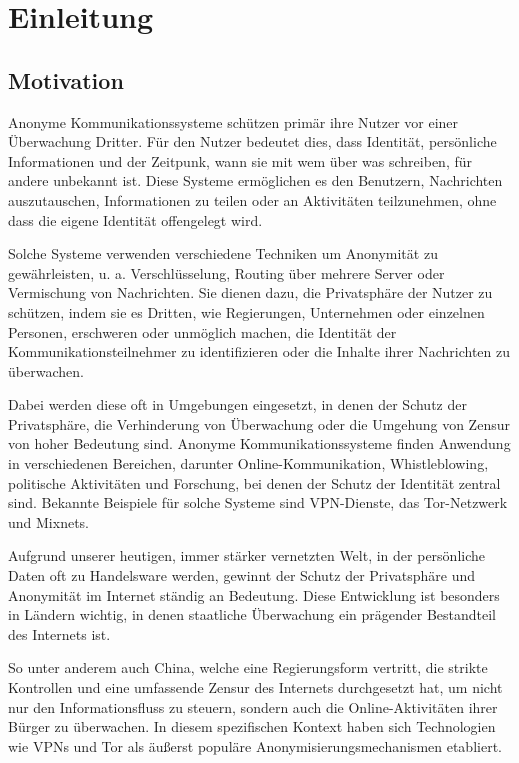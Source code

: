 \section{Einleitung}

\subsection{Motivation}

Anonyme Kommunikationssysteme schützen primär ihre Nutzer vor einer Überwachung Dritter. Für den Nutzer bedeutet dies, dass Identität, persönliche Informationen und der Zeitpunk, wann sie mit wem über was schreiben, für andere unbekannt ist. Diese Systeme ermöglichen es den Benutzern, Nachrichten auszutauschen, Informationen zu teilen oder an Aktivitäten teilzunehmen, ohne dass die eigene Identität offengelegt wird.

Solche Systeme verwenden verschiedene Techniken um Anonymität zu gewährleisten, u. a. Verschlüsselung, Routing über mehrere Server oder Vermischung von Nachrichten. Sie dienen dazu, die Privatsphäre der Nutzer zu schützen, indem sie es Dritten, wie Regierungen, Unternehmen oder einzelnen Personen, erschweren oder unmöglich machen, die Identität der Kommunikationsteilnehmer zu identifizieren oder die Inhalte ihrer Nachrichten zu überwachen.

Dabei werden diese oft in Umgebungen eingesetzt, in denen der Schutz der Privatsphäre, die Verhinderung von Überwachung oder die Umgehung von Zensur von hoher Bedeutung sind. Anonyme Kommunikationssysteme finden Anwendung in verschiedenen Bereichen, darunter Online-Kommunikation, Whistleblowing, politische Aktivitäten und Forschung, bei denen der Schutz der Identität zentral sind. Bekannte Beispiele für solche Systeme sind VPN-Dienste, das Tor-Netzwerk und Mixnets.

Aufgrund unserer heutigen, immer stärker vernetzten Welt, in der persönliche Daten oft zu Handelsware werden, gewinnt der Schutz der Privatsphäre und Anonymität im Internet ständig an Bedeutung. Diese Entwicklung ist besonders in Ländern wichtig, in denen staatliche Überwachung ein prägender Bestandteil des Internets ist.

So unter anderem auch China, welche eine Regierungsform vertritt, die strikte Kontrollen und eine umfassende Zensur des Internets durchgesetzt hat, um nicht nur den Informationsfluss zu steuern, sondern auch die Online-Aktivitäten ihrer Bürger zu überwachen. In diesem spezifischen Kontext haben sich Technologien wie VPNs und Tor als äußerst populäre Anonymisierungsmechanismen etabliert.

